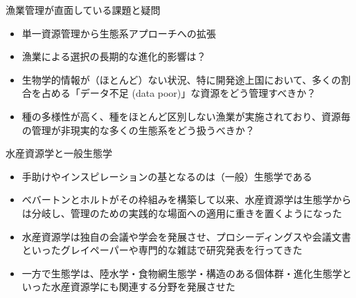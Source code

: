 \documentclass[
  ignorenonframetext,
]{beamer}
\providecommand{\tightlist}{%
  \setlength{\itemsep}{0pt}\setlength{\parskip}{0pt}}
\newcommand{\vspacelarge}{\vspace{6mm}}
\begin{document}
\begin{frame}{漁業管理が直面している課題と疑問}
\protect\hypertarget{ux6f01ux696dux7ba1ux7406ux304cux76f4ux9762ux3057ux3066ux3044ux308bux8ab2ux984cux3068ux7591ux554f}{}

\begin{itemize}
\tightlist
\item
  単一資源管理から生態系アプローチへの拡張\\
  \vspacelarge
\item
  漁業による選択の長期的な進化的影響は？\\
  \vspacelarge
\item
  生物学的情報が（ほとんど）ない状況、特に開発途上国において、多くの割合を占める「データ不足
  (data poor)」な資源をどう管理すべきか？\\
  \vspacelarge
\item
  種の多様性が高く、種をほとんど区別しない漁業が実施されており、資源毎の管理が非現実的な多くの生態系をどう扱うべきか？
\end{itemize}

\end{frame}

\begin{frame}{水産資源学と一般生態学}
\protect\hypertarget{ux6c34ux7523ux8cc7ux6e90ux5b66ux3068ux4e00ux822cux751fux614bux5b66}{}

\begin{itemize}
\tightlist
\item
  手助けやインスピレーションの基となるのは（一般）生態学である\\
  \vspacelarge
\item
  べバートンとホルトがその枠組みを構築して以来、水産資源学は生態学からは分岐し、管理のための実践的な場面への適用に重きを置くようになった\\
  \vspacelarge
\item
  水産資源学は独自の会議や学会を発展させ、プロシーディングスや会議文書といったグレイペーパーや専門的な雑誌で研究発表を行ってきた\\
  \vspacelarge
\item
  一方で生態学は、陸水学・食物網生態学・構造のある個体群・進化生態学といった水産資源学にも関連する分野を発展させた
\end{itemize}

\end{frame}
\end{document}
